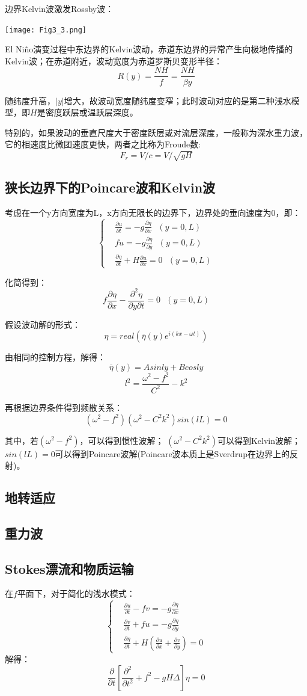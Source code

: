 \documentclass{article}
\begin{document}
边界Kelvin波激发Rossby波：
\begin{center}
    \texttt{[image: Fig3\_3.png]}
\end{center}
El Niño演变过程中东边界的Kelvin波动，赤道东边界的异常产生向极地传播的Kelvin波；在赤道附近，波动宽度为赤道罗斯贝变形半径：
$$R(y) = \frac{NH}{f} = \frac{NH}{\beta y}$$

随纬度升高，$|y|$增大，故波动宽度随纬度变窄；此时波动对应的是第二种浅水模型，即$H$是密度跃层或温跃层深度。

特别的，如果波动的垂直尺度大于密度跃层或对流层深度，一般称为深水重力波，它的相速度比微团速度更快，两者之比称为Froude数:
$$F_r = V/c = V/\sqrt{gH}$$

\subsection{狭长边界下的Poincare波和Kelvin波}
考虑在一个y方向宽度为L，x方向无限长的边界下，边界处的垂向速度为0，即：
$$\begin{cases}
    &\frac{\partial u}{\partial t}=-g\frac{\partial \eta}{\partial x} \ \ \ (y=0,L) \\
    &fu=-g\frac{\partial \eta}{\partial y} \ \ \ (y=0,L)\\
    &\frac{\partial \eta}{\partial t}+H\frac{\partial u}{\partial x} = 0 \ \ \ (y=0,L)
\end{cases}$$

化简得到：
$$f\frac{\partial \eta}{\partial x}-\frac{\partial^2 \eta}{\partial y\partial t} = 0 \ \ \ (y=0,L)$$

假设波动解的形式：
$$\eta = real(\overline{\eta}(y)e^{i(kx-\omega t)})$$

由相同的控制方程，解得：
$$\overline{\eta}(y) = Asinly + Bcosly$$
$$l^2 = \frac{\omega^2-f^2}{C^2} - k^2$$

再根据边界条件得到频散关系：
$$(\omega^2-f^2)(\omega^2-C^2k^2)sin(lL) = 0$$

其中，若$(\omega^2-f^2)$，可以得到惯性波解；
$(\omega^2-C^2k^2)$可以得到Kelvin波解；
$sin(lL)=0$可以得到Poincare波解(Poincare波本质上是Sverdrup在边界上的反射)。

\subsection{地转适应}
\subsection{重力波}
\subsection{Stokes漂流和物质运输}
在$f$平面下，对于简化的浅水模式：
$$\begin{cases}
    &\frac{\partial u}{\partial t}-fv=-g\frac{\partial \eta}{\partial x}\\
    &\frac{\partial v}{\partial t}+fu=-g\frac{\partial \eta}{\partial y}\\
    &\frac{\partial \eta}{\partial t}+H(\frac{\partial u}{\partial x}+\frac{\partial v}{\partial y} ) = 0
\end{cases}$$
解得：
$$\frac{\partial }{\partial t}\left[\frac{\partial^2 }{\partial t^2}+f^2-gH\Delta\right]\eta=0 $$
\end{document}
